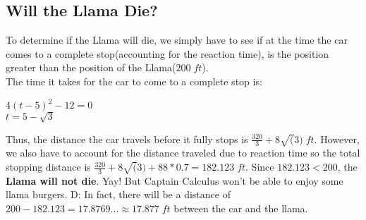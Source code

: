 \documentclass{article}
\begin{document}
		\subsection{Will the Llama Die?}
			To determine if the Llama will die, we simply have to see if at the time the car comes to a complete stop(accounting for the reaction time), is the position greater than the position of the Llama($200\;ft$).\\
			The time it takes for the car to come to a complete stop is:
			\begin{center}
				$4(t-5)^2-12 = 0$\\
				$t = 5-\sqrt{3}$
			\end{center}
			Thus, the distance the car travels before it fully stops is $\frac{320}{3} + 8\sqrt(3)\; ft$. However, we also have to account for the distance traveled due to reaction time so the total stopping distance is $\frac{320}{3} + 8\sqrt(3) + 88*0.7 = 182.123\;ft$. Since $182.123 < 200$, the \textbf{Llama will not die}. Yay! But Captain Calculus won't be able to enjoy some llama burgers. D: In fact, there will be a distance of $200-182.123 = 17.8769...\approx 17.877\;ft$ between the car and the llama.
\end{document}
